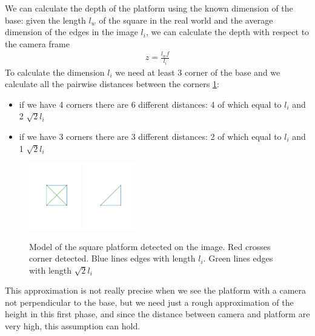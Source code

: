 We can calculate the depth of the platform using the known dimension of the base: given the length $l_w$ of the square in the real world and the average dimension of the edges in the image $l_i$, we can calculate the depth with respect to the camera frame 
\begin{align}
z = \frac{l_w f}{l_i}
\end{align}
To calculate the dimension $l_i$ we need at least 3 corner of the base and we calculate all the pairwise distances between the corners \ref{fig:platform_profile}:
\begin{itemize}
\item if we have 4 corners there are 6 different distances: 4 of which equal to $l_i$ and 2 $\sqrt{2}l_i$
\item if we have 3 corners there are 3 different distances: 2 of which equal to $l_i$ and 1 $\sqrt{2}l_i$
\end{itemize}

\begin{figure}[!htbp]
  \centering
  {\includegraphics[width=0.2\textwidth]{img/platform_4_edges.pdf}\label{fig:4_corners}}
  \hspace{5em}
  {\includegraphics[width=0.2\textwidth]{img/platform_3_edges.pdf}\label{fig:3_corners}}
  \caption{Model of the square platform detected on the image. Red crosses corner detected. Blue lines edges with length $l_i$. Green lines edges with length $\sqrt{2}l_i$ }
  \label{fig:platform_profile}
\end{figure} 

This approximation is not really precise when we see the platform with a camera not perpendicular to the base, but we need just a rough approximation of the height in this first phase, and since the distance between camera and platform are very high, this assumption can hold.\\

